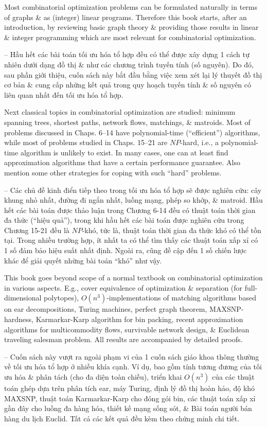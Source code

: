\documentclass{article}
\begin{document}
\begin{itemize}
    Most combinatorial optimization problems can be formulated naturally in terms of graphs \& as (integer) linear programs. Therefore this book starts, after an introduction, by reviewing basic graph theory \& providing those results in linear \& integer programming which are most relevant for combinatorial optimization.

    -- Hầu hết các bài toán tối ưu hóa tổ hợp đều có thể được xây dựng 1 cách tự nhiên dưới dạng đồ thị \& như các chương trình tuyến tính (số nguyên). Do đó, sau phần giới thiệu, cuốn sách này bắt đầu bằng việc xem xét lại lý thuyết đồ thị cơ bản \& cung cấp những kết quả trong quy hoạch tuyến tính \& số nguyên có liên quan nhất đến tối ưu hóa tổ hợp.

    Next classical topics in combinatorial optimization are studied: minimum spanning trees, shortest paths, network flows, matchings, \& matroids. Most of problems discussed in Chaps. 6--14 have polynomial-time (``efficient'') algorithms, while most of problems studied in Chaps. 15--21 are $NP$-hard, i.e., a polynomial-time algorithm is unlikely to exist. In many cases, one can at least find approximation algorithms that have a certain performance guarantee. Also mention some other strategies for coping with such ``hard'' problems.

    -- Các chủ đề kinh điển tiếp theo trong tối ưu hóa tổ hợp sẽ được nghiên cứu: cây khung nhỏ nhất, đường đi ngắn nhất, luồng mạng, phép so khớp, \& matroid. Hầu hết các bài toán được thảo luận trong Chương 6-14 đều có thuật toán thời gian đa thức (``hiệu quả''), trong khi hầu hết các bài toán được nghiên cứu trong Chương 15-21 đều là $NP$-khó, tức là, thuật toán thời gian đa thức khó có thể tồn tại. Trong nhiều trường hợp, ít nhất ta có thể tìm thấy các thuật toán xấp xỉ có 1 số đảm bảo hiệu suất nhất định. Ngoài ra, cũng đề cập đến 1 số chiến lược khác để giải quyết những bài toán ``khó'' như vậy.

    This book goes beyond scope of a normal textbook on combinatorial optimization in various aspects. E.g., cover equivalence of optimization \& separation (for full-dimensional polytopes), $O(n^3)$-implementations of matching algorithms based on ear decompositions, Turing machines, perfect graph theorem, MAXSNP-hardness, Karmarkar-Karp algorithm for bin packing, recent approximation algorithms for multicommodity flows, survivable network design, \& Euclidean traveling salesman problem. All results are accompanied by detailed proofs.

    -- Cuốn sách này vượt ra ngoài phạm vi của 1 cuốn sách giáo khoa thông thường về tối ưu hóa tổ hợp ở nhiều khía cạnh. Ví dụ, bao gồm tính tương đương của tối ưu hóa \& phân tách (cho đa diện toàn chiều), triển khai $O(n^3)$ của các thuật toán ghép dựa trên phân tích ear, máy Turing, định lý đồ thị hoàn hảo, độ khó MAXSNP, thuật toán Karmarkar-Karp cho đóng gói bin, các thuật toán xấp xỉ gần đây cho luồng đa hàng hóa, thiết kế mạng sống sót, \& Bài toán người bán hàng du lịch Euclid. Tất cả các kết quả đều kèm theo chứng minh chi tiết.


\end{itemize}
\end{document}
